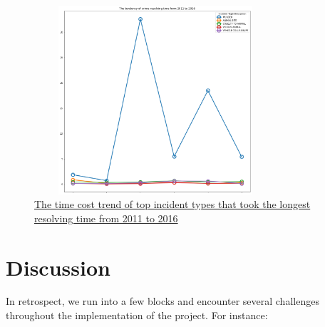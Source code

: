\documentclass{article} %
\begin{document}
\begin{figure}[H]
	\begin{center}
		\includegraphics[height=7cm, width=9cm]{6.png}
	\end{center}
	\caption{\hyperref[appendix:plot4]{The time cost trend of top incident types that took the longest resolving time  from 2011 to 2016}}
\end{figure}

\section{Discussion}
In retrospect, we run into a few blocks and encounter several challenges throughout the implementation of the project. For instance:
\end{document}
